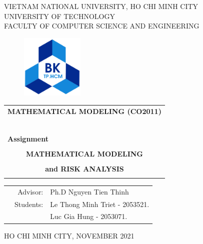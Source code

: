 \documentclass[a4paper]{article}
\begin{document}
\begin{titlepage}
	\begin{center}
		VIETNAM NATIONAL UNIVERSITY, HO CHI MINH CITY \\
		UNIVERSITY OF TECHNOLOGY \\
		FACULTY OF COMPUTER SCIENCE AND ENGINEERING
	\end{center}

	\vspace{1cm}

	\begin{figure}[h!]
		\begin{center}
			\includegraphics[width=3cm]{hcmut.png}
		\end{center}
	\end{figure}

	\vspace{1cm}


	\begin{center}
		\begin{tabular}{c}
			\multicolumn{1}{c}{\textbf{{\Large MATHEMATICAL MODELING (CO2011)}}} \\
			~~                                                                   \\
			\hline
			\\
			\multicolumn{1}{l}{\textbf{{\Large Assignment}}}                     \\
			\\
			\textbf{{\Huge MATHEMATICAL MODELING}}                               \\
			\\
			\textbf{{\Huge and RISK ANALYSIS}}                                   \\
			\\
			\hline
		\end{tabular}
	\end{center}

	\vspace{2cm}

	\begin{table}[h]
		\begin{tabular}{rrl}
			\hspace{5 cm} & Advisor:  & Ph.D Nguyen Tien Thinh         \\
			              & Students: & Le Thong Minh Triet - 2053521. \\
			              &           & Luc Gia Hung - 2053071.        \\
		\end{tabular}
	\end{table}

	\begin{center}
		{\footnotesize HO CHI MINH CITY, NOVEMBER 2021}
	\end{center}
\end{titlepage}
\end{document}
